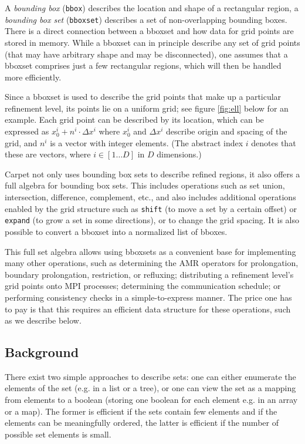 \documentclass[conference]{IEEEtran}
\begin{document}
A \emph{bounding box} (\verb+bbox+) describes the location and shape
of a rectangular region, a \emph{bounding box set} (\verb+bboxset+)
describes a set of non-overlapping bounding boxes.
There is a direct connection between a bboxset and how data for grid
points are stored in memory.
While a bboxset
can in principle describe any set of grid points (that may have
arbitrary shape and may be disconnected), one assumes that a bboxset
comprises just a few rectangular regions, which will then be handled more
efficiently.

Since a bboxset is used to describe the grid points that make up a
particular refinement level, its points lie on a uniform
grid; see figure \ref{fig:ell} below for an example.
Each grid point can be described by its location, which
can be expressed as $x_0^i + n^i \cdot \Delta x^i$ where $x_0^i$ and
$\Delta x^i$ describe origin and spacing of the grid, and $n^i$
is a vector with integer elements. (The abstract index $i$ denotes
that these are vectors, where $i \in [1 \ldots D]$ in $D$ dimensions.)

Carpet not only uses bounding box sets to describe refined regions, it
also offers a full algebra for bounding box sets. This includes
operations such as set union, intersection, difference, complement,
etc., and also includes additional operations enabled by the grid
structure such as \verb+shift+ (to move a set by a certain offset) or
\verb+expand+ (to grow a set in some directions), or to change the
grid spacing. It is also possible to convert a
bboxset into a normalized list of bboxes.

This full set algebra allows using bboxsets as a convenient base
for implementing many other operations, such as
determining the AMR operators for prolongation, boundary
prolongation, restriction, or refluxing; distributing a refinement
level's grid points onto MPI processes; determining the communication
schedule; or performing consistency checks in a simple-to-express
manner. The price one has to pay is that this requires an efficient
data structure for these operations, such as we describe below.

\subsection{Background}

There exist two simple approaches to
describe sets: one can either enumerate the elements of the set (e.g.
in a list or a tree), or one can view the set as a mapping from
elements to a boolean (storing one boolean for each element e.g. in an
array or a map). The former is efficient if the sets contain few
elements and if the elements can be meaningfully ordered, the latter
is efficient if the number of possible set elements is small.
\end{document}
